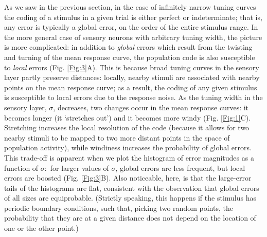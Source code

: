 \documentclass[a4paper]{article}%
\begin{document}
As we saw in the previous section, in the case of infinitely narrow tuning
curves the coding of a stimulus in a given trial is either perfect or
indeterminate; that is, any error is typically a global error, on the order of
the entire stimulus range. In the more general case of sensory neurons with
arbitrary tuning width, the picture is more complicated: in addition to
\textit{global} errors which result from the twisting and turning of the mean
response curve, the population code is also susceptible to \textit{local}
errors (Fig. \ref{Fig:3}A). This is because broad tuning curves in the sensory
layer partly preserve distances: locally, nearby stimuli are associated with
nearby points on the mean response curve; as a result, the coding of any given
stimulus is susceptible to local errors due to the response noise. As the
tuning width in the sensory layer, $\sigma$, decreases, two changes occur in
the mean response curves: it becomes longer (it `stretches out') and it
becomes more windy (Fig. \ref{Fig:1}C). Stretching increases the local
resolution of the code (because it allows for two nearby stimuli to be mapped
to two more distant points in the space of population activity), while
windiness increases the probability of global errors. This trade-off is
apparent when we plot the histogram of error magnitudes as a function of
$\sigma$:\ for larger values of $\sigma$, global errors are less frequent, but
local errors are boosted (Fig. \ref{Fig:3}B). Also noticeable, here, is that
the large-error tails of the histograms are flat, consistent with the
observation that global errors of all sizes are equiprobable. (Strictly
speaking, this happens if the stimulus has periodic boundary conditions, such
that, picking two random points, the probability that they are at a given
distance does not depend on the location of one or the other point.)
\end{document}
